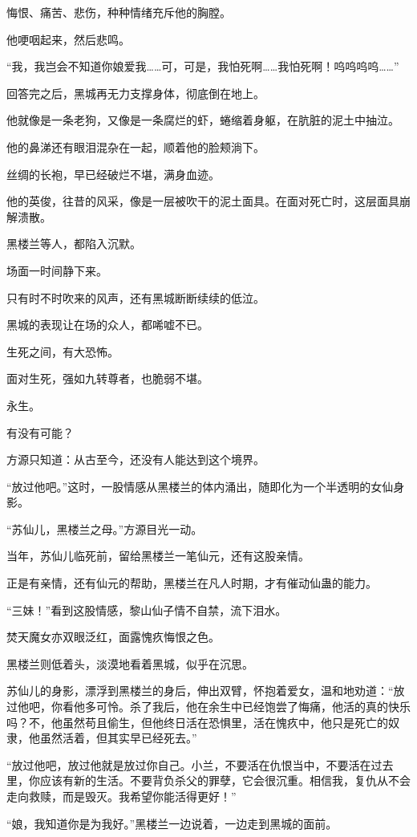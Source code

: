 \begin{this_body}
悔恨、痛苦、悲伤，种种情绪充斥他的胸膛。

他哽咽起来，然后悲鸣。

“我，我岂会不知道你娘爱我……可，可是，我怕死啊……我怕死啊！呜呜呜呜……”

回答完之后，黑城再无力支撑身体，彻底倒在地上。

他就像是一条老狗，又像是一条腐烂的虾，蜷缩着身躯，在肮脏的泥土中抽泣。

他的鼻涕还有眼泪混杂在一起，顺着他的脸颊淌下。

丝绸的长袍，早已经破烂不堪，满身血迹。

他的英俊，往昔的风采，像是一层被吹干的泥土面具。在面对死亡时，这层面具崩解溃散。

黑楼兰等人，都陷入沉默。

场面一时间静下来。

只有时不时吹来的风声，还有黑城断断续续的低泣。

黑城的表现让在场的众人，都唏嘘不已。

生死之间，有大恐怖。

面对生死，强如九转尊者，也脆弱不堪。

永生。

有没有可能？

方源只知道：从古至今，还没有人能达到这个境界。

“放过他吧。”这时，一股情感从黑楼兰的体内涌出，随即化为一个半透明的女仙身影。

“苏仙儿，黑楼兰之母。”方源目光一动。

当年，苏仙儿临死前，留给黑楼兰一笔仙元，还有这股亲情。

正是有亲情，还有仙元的帮助，黑楼兰在凡人时期，才有催动仙蛊的能力。

“三妹！”看到这股情感，黎山仙子情不自禁，流下泪水。

焚天魔女亦双眼泛红，面露愧疚悔恨之色。

黑楼兰则低着头，淡漠地看着黑城，似乎在沉思。

苏仙儿的身影，漂浮到黑楼兰的身后，伸出双臂，怀抱着爱女，温和地劝道：“放过他吧，你看他多可怜。杀了我后，他在余生中已经饱尝了悔痛，他活的真的快乐吗？不，他虽然苟且偷生，但他终日活在恐惧里，活在愧疚中，他只是死亡的奴隶，他虽然活着，但其实早已经死去。”

“放过他吧，放过他就是放过你自己。小兰，不要活在仇恨当中，不要活在过去里，你应该有新的生活。不要背负杀父的罪孽，它会很沉重。相信我，复仇从不会走向救赎，而是毁灭。我希望你能活得更好！”

“娘，我知道你是为我好。”黑楼兰一边说着，一边走到黑城的面前。


\end{this_body}
